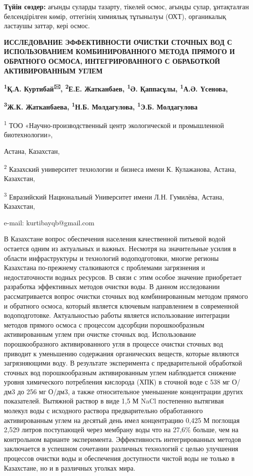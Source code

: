 {\bfseries Түйін сөздер:} ағынды суларды тазарту, тікелей осмос, ағынды
сулар, ұнтақталған белсендірілген көмір, оттегінің химиялық тұтынылуы
(ОХТ), органикалық ластаушы заттар, кері осмос.

{\bfseries ИССЛЕДОВАНИЕ ЭФФЕКТИВНОСТИ ОЧИСТКИ СТОЧНЫХ ВОД С ИСПОЛЬЗОВАНИЕМ
КОМБИНИРОВАННОГО МЕТОДА ПРЯМОГО И ОБРАТНОГО ОСМОСА, ИНТЕГРИРОВАННОГО С
ОБРАБОТКОЙ АКТИВИРОВАННЫМ УГЛЕМ}

{\bfseries \textsuperscript{1}Қ.А. Куртибай\textsuperscript{🖂},
\textsuperscript{2}Е.Е. Жатканбаев, \textsuperscript{1}Ә. Қаппасұлы,
\textsuperscript{1}А.Ә. Үсенова,}

{\bfseries \textsuperscript{3}Ж.К. Жатканбаева, \textsuperscript{1}Н.Б.
Молдагулова, \textsuperscript{1}Э.Б. Молдагулова}

\textsuperscript{1} ТОО «Научно-производственный центр экологической и
промышленной биотехнологии»,

Астана, Казахстан,

\textsuperscript{2} Казахский университет технологии и бизнеса имени К.
Кулажанова, Астана, Казахстан,

\textsuperscript{3} Евразийский Национальный Университет имени Л.Н.
Гумилёва, Астана, Казахстан,

e-mail: kurtibayqb@gmail.com

В Казахстане вопрос обеспечения населения качественной питьевой водой
остается одним из актуальных и важных. Несмотря на значительные усилия в
области инфраструктуры и технологий водоподготовки, многие регионы
Казахстана по-прежнему сталкиваются с проблемами загрязнения и
недостаточности водных ресурсов. В связи с этим особое значение
приобретает разработка эффективных методов очистки воды. В данном
исследовании рассматривается вопрос очистки сточных вод комбинированным
методом прямого и обратного осмоса, который является ключевым
направлением в современной водоподготовке. Актуальностью работы является
использование интеграции методов прямого осмоса с процессом адсорбции
порошкообразным активированным углем при очистке сточных вод.
Использование порошкообразного активированного угля в процессе очистки
сточных вод приводит к уменьшению содержания органических веществ,
которые являются загрязняющими воду. В результате эксперимента с
предварительной обработкой сточных вод порошкообразным активированным
углем наблюдается снижение уровня химического потребления кислорода
(ХПК) в сточной воде с 538 мг О/дм3 до 256 мг О/дм3, а также
относительное уменьшение концентрации других показателей. Вытяжной
раствор в виде 1,5 М NaCl постепенно вытягивая молекул воды с исходного
раствора предварительно обработанного активированным углем на десятый
день имел концентрацию 0,425 М поглощая 2,529 литров поступающей через
мембрану воды что на 27,6\% больше, чем на контрольном варианте
эксперимента. Эффективность интегрированных методов заключается в
успешном сочетании различных технологий с целью улучшения процессов
очистки воды и обеспечения доступности чистой воды не только в
Казахстане, но и в различных уголках мира.

